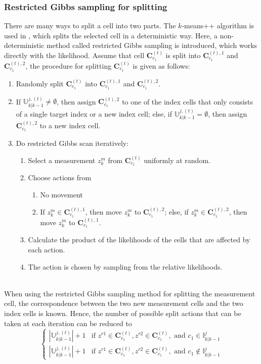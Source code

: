 \subsubsection{Restricted Gibbs sampling for splitting}
There are many ways to split a cell into two parts. The $k$-means++ algorithm \cite{kmeans++} is used in \cite{soextended}, which splits the selected cell in a deterministic way. Here, a non-deterministic method called restricted Gibbs sampling \cite{mergesplit} is introduced, which works directly with the likelihood. Assume that cell $\mathbf{C}_{c_1}^{(t)}$ is split into $\mathbf{C}_{c_1}^{(t),1}$ and $\mathbf{C}_{c_1}^{(t),2}$, the procedure for splitting $\mathbf{C}_{c_1}^{(t)}$ is given as follows:
\begin{enumerate}
    \item Randomly split $\mathbf{C}_{c_1}^{(t)}$ into $\mathbf{C}_{c_1}^{(t),1}$ and $\mathbf{C}_{c_1}^{(t),2}$.
    \item If $\mathbb{U}^{j,(t)}_{k|k-1}\neq\emptyset$, then assign $\mathbf{C}_{c_1}^{(t),2}$ to one of the index cells that only consists of a single target index or a new index cell; else, if $\mathbb{U}^{j,(t)}_{k|k-1}=\emptyset$, then assign $\mathbf{C}_{c_1}^{(t),2}$ to a new index cell. 
    \item Do restricted Gibbs scan iteratively:
    \begin{enumerate}
        \item Select a measurement $z_k^m$ from $\mathbf{C}_{c_1}^{(t)}$ uniformly at random.
        \item Choose actions from
        \begin{enumerate}
            \item No movement
            \item If $z_k^m\in\mathbf{C}_{c_1}^{(t),1}$, then move $z_k^m$ to $\mathbf{C}_{c_1}^{(t),2}$; else, if $z_k^m\in\mathbf{C}_{c_1}^{(t),2}$, then move $z_k^m$ to $\mathbf{C}_{c_1}^{(t),1}$.
        \end{enumerate}
        \item Calculate the product of the likelihoods of the cells that are affected by each action.
        \item The action is chosen by sampling from the relative likelihoods. 
    \end{enumerate}
\end{enumerate}

~\\
When using the restricted Gibbs sampling method for splitting the measurement cell, the correspondence between the two new measurement cells and the two index cells is known. Hence, the number of possible split actions that can be taken at each iteration can be reduced to
$$\begin{cases}
|\mathbb{U}^{j,(t)}_{k|k-1}| + 1 & \text{if  } z^{r1}\in\mathbf{C}_{c_1}^{(t)}, z^{r2}\in\mathbf{C}_{c_1}^{(t)}, \text{  and  } c_1\in\mathbb{I}^j_{k|k-1}\\
|\mathbb{U}^{j,(t)}_{k|k-1}| + 1 & \text{if  } z^{r1}\in\mathbf{C}_{c_1}^{(t)}, z^{r2}\in\mathbf{C}_{c_1}^{(t)}, \text{  and  } c_1\notin\mathbb{I}^j_{k|k-1}
\end{cases}$$

